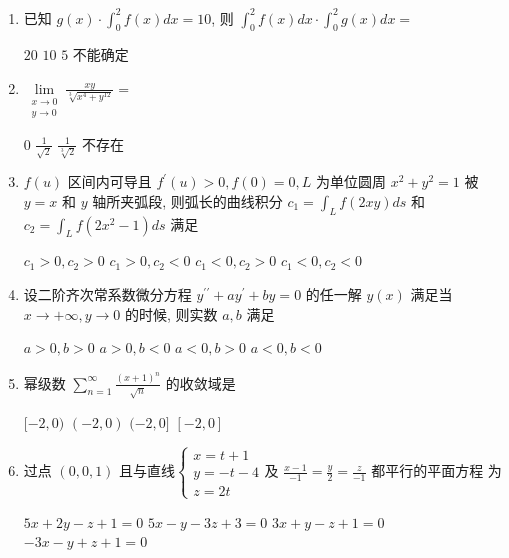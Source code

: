 \begin{enumerate}
\begin{enumerate}
\item 
已知 $g(x) \cdot \int_{0}^{2} f(x) d x=10$, 则 $\int_{0}^{2} f(x) d x \cdot \int_{0}^{2} g(x) d x=$  


\fourchoices
{$ 20 $}
{$ 10 $}
{$ 5 $}
{不能确定}

\item 
$ \lim\limits _{\substack{ x \rightarrow 0 \\ y \rightarrow 0}} \frac{x y}{\sqrt[3]{x^{4}+y^{12}}}= $  


\fourchoices
{$ 0 $}
{$\frac{1}{\sqrt{2}}$}
{$\frac{1}{\sqrt[3]{2}}$}
{不存在}


\item 
$f(u)$ 区间内可导且 $f^{\prime}(u)>0, f(0)=0, L$ 为单位圆周 $x^{2}+y^{2}=1$ 被 $y=x$ 和 $y$ 轴所夹弧段, 则弧长的曲线积分 $c_{1}=\int_{L} f(2 x y) d s$ 和 $c_{2}=\int_{L} f\left(2 x^{2}-1\right) d s$ 满足  

\fourchoices
{$c_{1}>0, c_{2}>0$}
{$c_{1}>0, c_{2}<0$}
{$c_{1}<0, c_{2}>0$}
{$c_{1}<0, c_{2}<0$}

\item 
设二阶齐次常系数微分方程 $y^{\prime \prime}+a y^{\prime}+b y=0$ 的任一解 $y(x)$ 满足当 $x \rightarrow+\infty, y \rightarrow 0 $  的时候, 则实数 $a, b$ 满足  


\fourchoices
{$a>0, b>0$}
{$a>0, b<0$}
{$a<0, b>0$}
{$a<0, b<0$}

\item 
幂级数 $\sum\limits_{n=1}^{\infty} \frac{(x+1)^{n}}{\sqrt{n}}$ 的收敛域是  


\fourchoices
{$[-2,0)$}
{$(-2,0)$}
{$(-2,0]$}
{$[-2,0]$}

\item 
过点 $(0,0,1)$ 且与直线$\left\{\begin{array}{l}x=t+1 \\ y=-t-4 \\ z=2 t\end{array}\right.$及 $\frac{x-1}{-1}=\frac{y}{2}=\frac{z}{-1}$ 都平行的平面方程
为  


\fourchoices
{$5 x+2 y-z+1=0$}
{$5 x-y-3 z+3=0$}
{$3 x+y-z+1=0$}
{$-3 x-y+z+1=0$}




	\end{enumerate}


\end{enumerate}
